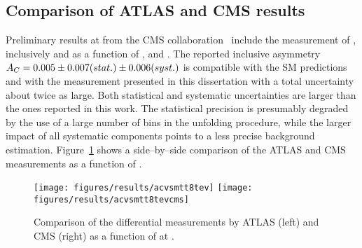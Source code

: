 \subsection{Comparison of ATLAS and CMS results}

Preliminary results at \eighttev{} from the CMS
collaboration~\cite{CMS-PAS-TOP-12-033} include the measurement of
\ac{}, inclusively and as a function of \mtt{}, \pttt{} and \ytt{}.
The reported inclusive asymmetry
\mbox{$A_C{}=0.005\pm0.007(stat.)\pm0.006(syst.)$} is compatible with the SM
predictions and with the measurement presented in this dissertation
with a total uncertainty about twice as large. Both
statistical and systematic uncertainties are larger than the ones
reported in this work. The statistical precision is presumably
degraded by the use of a large number of \dy{} bins in the unfolding
procedure, while the larger impact of all systematic components
points to a less precise background estimation.
Figure~\ref{fig:comparediff8tev} shows a side--by--side comparison of
the ATLAS and CMS measurements as a function of \mtt{}.

\begin{figure}[!htb]\centering
  \texttt{[image: figures/results/acvsmtt8tev]}
  \texttt{[image: figures/results/acvsmtt8tevcms]}
  \caption{Comparison of the differential \ac{} measurements by ATLAS
    (left) and CMS (right) as a function of \mtt{} at \eighttev{}.} 
  \label{fig:comparediff8tev}
\end{figure}
